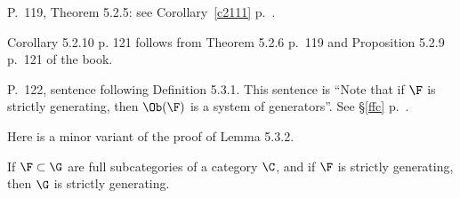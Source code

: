 \documentclass[12pt]{article}
\theoremstyle{remark}
\theoremstyle{definition}
\begin{document}
%

\begin{s}
P.~119, Theorem 5.2.5: see Corollary~\ref{c2111} p.~.
\end{s}

%

\begin{s}
Corollary 5.2.10 p. 121 follows from Theorem 5.2.6 p.~119 and Proposition 5.2.9 p.~121 of the book.
\end{s}

%

\begin{s}
P.~122, sentence following Definition 5.3.1. This sentence is ``Note that if $\F$ is strictly generating, then $\Ob(\F)$ is a system of generators''. See \S\ref{ffc} p.~.
\end{s}



Here is a minor variant of the proof of Lemma 5.3.2. 

\begin{lem}[Lemma 5.3.2 p.~122]
If $\F\subset\G$ are full subcategories of a category $\C$, and if $\F$ is strictly generating, then $\G$ is strictly generating. 
\end{lem} 
\end{document}
